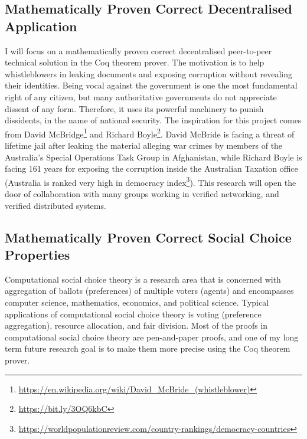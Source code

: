 \documentclass[a4paper]{article}
\begin{document}
 

\subsection{Mathematically Proven Correct Decentralised Application}
I will focus on a mathematically proven correct decentralised peer-to-peer technical solution 
\cite{liu2004linkable, Clarke2001, schimmer2009peer, 10.1145/1866307.1866346} in the Coq theorem prover. The motivation 
is to help 
whistleblowers in leaking documents and exposing corruption without revealing their identities.
Being vocal against the government is one the most fundamental right of any citizen, but many 
authoritative governments do not appreciate dissent of any form. Therefore, it uses 
its powerful machinery to punish dissidents, in the name of national security. 
The inspiration for this project comes from David McBridge\footnote{\url{https://en.wikipedia.org/wiki/David_McBride_(whistleblower)}} and 
Richard Boyle\footnote{\url{https://bit.ly/3OQ6kbC}}.
David McBride 
is facing a threat of lifetime jail after
leaking the material alleging war crimes by members of the Australia's Special Operations
Task Group in Afghanistan, while Richard Boyle is facing 161 years for exposing the corruption 
inside the Australian Taxation office
(Australia is ranked very high in 
democracy index\footnote{\url{https://worldpopulationreview.com/country-rankings/democracy-countries}}). 
This research will open the door of collaboration with many groups working in verified 
networking, and verified distributed systems. 

\subsection{Mathematically Proven Correct Social Choice Properties}
Computational social choice theory is a research area that is concerned
with aggregation of ballots (preferences)  of multiple voters (agents) and encompasses 
computer science, mathematics, economics, and political science. Typical applications of 
computational social choice theory is voting (preference aggregation), resource allocation, and fair division.
Most of the proofs in computational social choice theory are pen-and-paper proofs, 
and one of my long term future research goal is to make them more precise using the Coq theorem prover.
\end{document}
